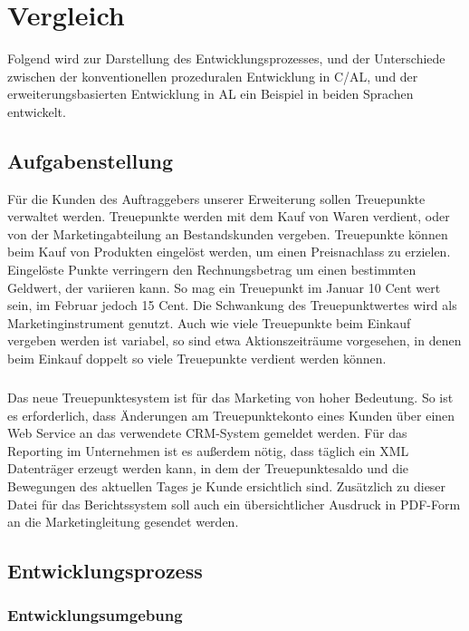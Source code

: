 \chapter{Vergleich}
\label{cha:Vergleich}

Folgend wird zur Darstellung des Entwicklungsprozesses, und der Unterschiede zwischen der konventionellen prozeduralen Entwicklung in C/AL, und der erweiterungsbasierten Entwicklung in AL ein Beispiel in beiden Sprachen entwickelt.


\section{Aufgabenstellung}
\label{sec:Aufgabenstellung}

Für die Kunden des Auftraggebers unserer Erweiterung sollen Treuepunkte verwaltet werden. Treuepunkte werden mit dem Kauf von Waren verdient, oder von der Marketingabteilung an Bestandskunden vergeben. Treuepunkte können beim Kauf von Produkten eingelöst werden, um einen Preisnachlass zu erzielen. Eingelöste Punkte verringern den Rechnungsbetrag um einen bestimmten Geldwert, der variieren kann. So mag ein Treuepunkt im Januar 10 Cent wert sein, im Februar jedoch 15 Cent. Die Schwankung des Treuepunktwertes wird als Marketinginstrument genutzt. Auch wie viele Treuepunkte beim Einkauf vergeben werden ist variabel, so sind etwa Aktionszeiträume vorgesehen, in denen beim Einkauf doppelt so viele Treuepunkte verdient werden können.

\paragraph{}
Das neue Treuepunktesystem ist für das Marketing von hoher Bedeutung. So ist es erforderlich, dass Änderungen am Treuepunktekonto eines Kunden über einen Web Service an das verwendete CRM-System gemeldet werden. Für das Reporting im Unternehmen ist es außerdem nötig, dass täglich ein XML Datenträger erzeugt werden kann, in dem der Treuepunktesaldo und die Bewegungen des aktuellen Tages je Kunde ersichtlich sind. Zusätzlich zu dieser Datei für das Berichtssystem soll auch ein übersichtlicher Ausdruck in PDF-Form an die Marketingleitung gesendet werden.
\pagebreak

\section{Entwicklungsprozess}
\label{sec:Entwicklungsprozess}

\subsection{Entwicklungsumgebung}
